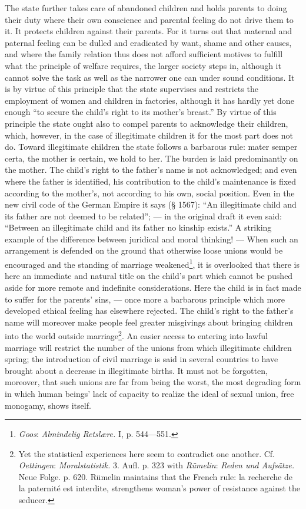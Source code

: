 \documentclass[12pt,a4paper,openany]{book}
\newcommand{\opage}[1]{\marginnote{\footnotesize\textit{[#1]}}}
\begin{document}
The state further takes care of abandoned children and holds parents to doing their duty where their own conscience and
parental feeling do not drive them to it. It protects children against their parents. For it turns out that maternal
and paternal feeling can be dulled and eradicated by want, shame and other causes, and where the family relation thus
does not afford sufficient motives to fulfill what the principle of welfare requires, the larger society steps in,
although it cannot solve the task as well as the narrower one can under sound conditions. It is by virtue of this
principle that the state supervises and restricts the employment of women and children in factories, although it has
hardly yet done enough ``to secure the child's right to its mother's breast.'' By virtue of this principle the state
ought also to compel parents to acknowledge their children, which, however, in the case of illegitimate children it for
the most part does not do. Toward illegitimate children the state follows a barbarous rule: mater semper certa, the
mother is certain, we hold to her. The burden
\opage{339}is laid predominantly on the mother. The child's right to the father's name is not acknowledged; and even
where the father is identified, his contribution to the child's maintenance is fixed according to the mother's, not
according to his own, social position. Even in the new civil code of the German Empire it says (§ 1567): ``An
illegitimate child and its father are not deemed to be related''; --- in the original draft it even said: ``Between an
illegitimate child and its father no kinship exists.'' A striking example of the difference between juridical and moral
thinking! --- When such an arrangement is defended on the ground that otherwise loose unions would be encouraged and the
standing of marriage weakened\footnote[1]{\emph{Goos}: \textit{Almindelig Retslære.} I, p. 544---551.}, it is
overlooked that there is here an immediate and natural title on the child's part which cannot be pushed aside for more
remote and indefinite considerations. Here the child is in fact made to suffer for the parents' sins, --- once more a
barbarous principle which more developed ethical feeling has elsewhere rejected. The child's right to the father's name
will moreover make people feel greater misgivings about bringing children into the world outside
marriage\footnote[2]{Yet the statistical experiences here seem to contradict one another. Cf. \emph{Oettingen}:
\textit{Moralstatistik.} 3. Aufl. p. 323 with \emph{Rümelin}: \textit{Reden und Aufsätze.} Neue Folge. p. 620. Rümelin
maintains that the French rule: la recherche de la paternité est interdite, strengthens woman's power of resistance
against the seducer.}. An easier access to entering into lawful marriage will restrict the number of the unions from which
illegitimate children spring; the introduction of civil marriage is said in several countries to have brought about a
decrease in illegitimate births. It must not be forgotten, moreover, that such unions are far from being the worst, the
most degrading form in which human beings' lack of capacity to realize the ideal of sexual union, free monogamy, shows
itself.
\end{document}
